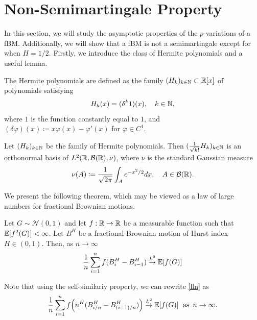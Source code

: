 \section{Non-Semimartingale Property}
In this section, we will study the asymptotic properties of the $p$-variations of a fBM. Additionally, we will show that a fBM is not a semimartingale except for when $H=1/2$. Firstly, we introduce the class of Hermite polynomials and a useful lemma.
\begin{defn}
    The Hermite polynomials are defined as the family $(H_{k})_{k\in \mathbb{N}}\subset \mathbb{R}[x]$ of polynomials satisfying
    \begin{equation}
        H_{k}(x)=(\delta^{k}1)(x), \quad k\in\mathbb{N},
    \end{equation}
    where $1$ is the function constantly equal to $1$, and $(\delta\varphi)(x)\coloneqq x\varphi(x)-\varphi'(x)$ for $\varphi\in C^{1}$.
\end{defn}
\begin{lem}\label{l2lemma}
    Let $(H_{k})_{k\in \mathbb{N}}$ be the family of Hermite polynomials. Then $(\frac{1}{\sqrt{k!}}H_{k})_{k\in\mathbb{N}}$ is an orthonormal basis of $L^{2}\left(\R,\mathcal{B}(\R),\nu\right)$, where $\nu$ is the standard Gaussian measure
    \begin{equation}
        \nu(A)\coloneqq \frac{1}{\sqrt{2\pi}}\int_{A}e^{-x^{2}/2}dx,\quad A\in\mathcal{B}(\mathbb{R}).
    \end{equation}
\end{lem}
We present the following theorem, which may be viewed as a law of large numbers for fractional Brownian motions.
\begin{thm}\label{llnthm}
    Let $G\sim\mathcal{N}(0,1)$ and let $f:\mathbb{R}\to\mathbb{R}$ be a measurable function such that $\mathbb{E}[f^{2}(G)]<\infty$. Let $B^H$ be a fractional Brownian motion of Hurst index $H\in (0,1)$. Then, as $n\to\infty$
    \begin{equation}\label{lln}
        \frac{1}{n}\sum_{i=1}^{n}f(B^{H}_{i}-B^{H}_{i-1})\overset{L^{2}}{\to} \mathbb{E}[f(G)]
    \end{equation}
\end{thm}
Note that using the self-similariy property, we can rewrite \eqref{lln} as
\begin{equation}
     \frac{1}{n}\sum_{i=1}^{n}f\left(n^{H}(B^{H}_{i/n}-B^{H}_{(i-1)/n})\right)\overset{L^{2}}{\to} \E[f(G)] \hspace{6 pt}\mathrm{as}\hspace{5 pt}n\to\infty.
\end{equation}
